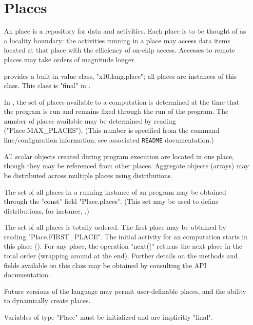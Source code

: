 \chapter{Places}\label{XtenPlaces}

An \Xten{} place is a repository for data and activities. Each place
is to be thought of as a locality boundary: the activities running in
a place may access data items located at that place with the
efficiency of on-chip access. Accesses to remote places may take
orders of magnitude longer.

{}\Xten{} provides a built-in value class, \xcd"x10.lang.place"; all
places are instances of this class.  This class is \xcd"final" in
{}\XtenCurrVer.

In \XtenCurrVer{}, the set of places available to a computation is
determined at the time that the program is run and remains fixed
through the run of the program. The number of places available 
may be determined by reading (\xcd"Place.MAX_PLACES"). (This number
is specified from the command line/configuration information; 
see associated {\tt README} documentation.)

All scalar objects created during program execution are located in one
place, though they may be referenced from other places. Aggregate
objects (arrays) may be distributed across multiple places using
distributions.

The set of all places in a running instance of an \Xten{} program may
be obtained through the \xcd"const" field \xcd"Place.places".  (This
set may be used to define distributions, for instance,
.) 


The set of all places is totally ordered.  The first place may be
obtained by reading \xcd"Place.FIRST_PLACE". The initial activity for
an \Xten{} computation starts in this place
(). For any place, the operation \xcd"next()"
returns the next place in the total order (wrapping around at the
end). Further details on the methods and fields available on this
class may be obtained by consulting the API documentation.

\begin{note}
Future versions of the language may permit user-definable
places, and the ability to dynamically create places.
\end{note}

\begin{staticrule*}
Variables of type \xcd"Place" must be initialized and are implicitly
\xcd"final".  
\end{staticrule*}

